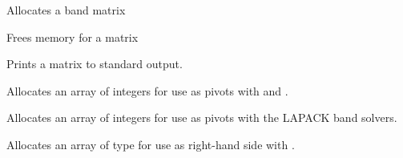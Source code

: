 \documentclass[letterpaper,10pt,english]{sphinxmanual}
\begin{document}
\begin{fulllineitems}
\label{linear_solvers/DLS:NewBandMat}
Allocates a {\hyperref[linear_solvers/DLS:DlsMat]{}} band matrix

\end{fulllineitems}


\begin{fulllineitems}
Frees memory for a {\hyperref[linear_solvers/DLS:DlsMat]{}} matrix

\end{fulllineitems}


\begin{fulllineitems}
Prints a {\hyperref[linear_solvers/DLS:DlsMat]{}} matrix to standard output.

\end{fulllineitems}


\begin{fulllineitems}
Allocates an array of  integers for use as pivots with
 and .

\end{fulllineitems}


\begin{fulllineitems}
Allocates an array of  integers for use as pivots with the
LAPACK band solvers.

\end{fulllineitems}


\begin{fulllineitems}
Allocates an array of type  for use as right-hand side
with .

\end{fulllineitems}
\end{document}
